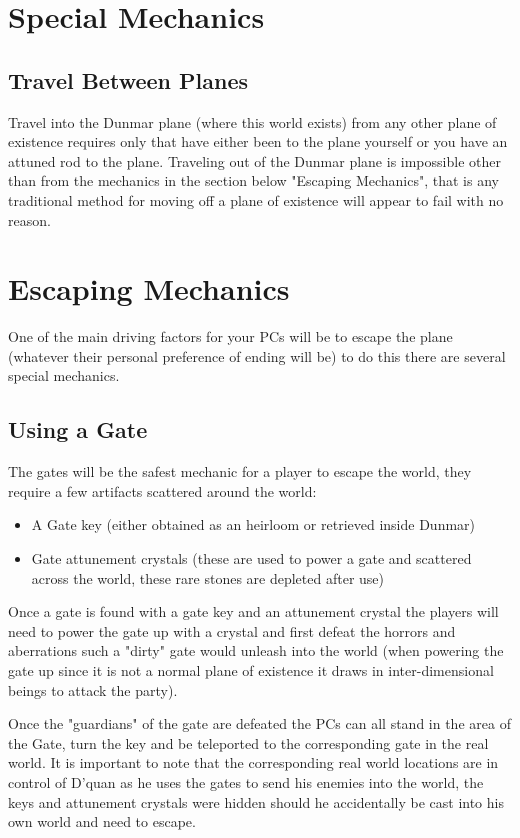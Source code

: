 \documentclass[10pt,twoside,twocolumn]{article}
\begin{document}
\section{Special Mechanics}

\subsection{Travel Between Planes}
Travel into the Dunmar plane (where this world exists) from any other plane of existence requires only that have either been to the plane yourself or you have an attuned rod to the plane. Traveling out of the Dunmar plane is impossible other than from the mechanics in the section below "Escaping Mechanics", that is any traditional method for moving off a plane of existence will appear to fail with no reason.

\section{Escaping Mechanics}
One of the main driving factors for your PCs will be to escape the plane (whatever their personal preference of ending will be) to do this there are several special mechanics.

\subsection{Using a Gate}
The gates will be the safest mechanic for a player to escape the world, they require a few artifacts scattered around the world:

\begin{itemize}
\item A Gate key (either obtained as an heirloom or retrieved inside Dunmar)
\item Gate attunement crystals (these are used to power a gate and scattered across the world, these rare stones are depleted after use)
\end{itemize}

Once a gate is found with a gate key and an attunement crystal the players will need to power the gate up with a crystal and first defeat the horrors and aberrations such a "dirty" gate would unleash into the world (when powering the gate up since it is not a normal plane of existence it draws in inter-dimensional beings to attack the party).

Once the "guardians" of the gate are defeated the PCs can all stand in the area of the Gate, turn the key and be teleported to the corresponding gate in the real world. It is important to note that the corresponding real world locations are in control of D'quan as he uses the gates to send his enemies into the world, the keys and attunement crystals were hidden should he accidentally be cast into his own world and need to escape.
\end{document}
